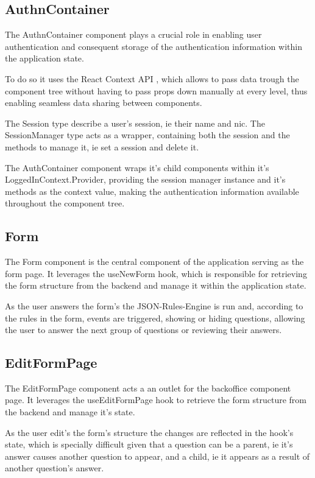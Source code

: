 \subsection{AuthnContainer}
The AuthnContainer component plays a crucial role in enabling user authentication and consequent storage of the authentication information within the application state.

To do so it uses the React Context API \cite{React_Context_API}, which allows to pass data trough the component tree without having to pass props down manually at every level, thus enabling seamless data sharing between components.

The Session type describe a user's session, ie their name and nic. The SessionManager type acts as a wrapper, containing both the session and the methods to manage it, ie set a session and delete it.

The AuthContainer component wraps it's child components within it's LoggedInContext.Provider, providing the session manager instance and it's methods as the context value, making the authentication information available throughout the component tree.

\subsection{Form}
The Form component is the central component of the application serving as the form page. It leverages the useNewForm hook, which is responsible for retrieving the form structure from the backend and manage it within the application state.

As the user answers the form's the JSON-Rules-Engine is run and, according to the rules in the form, events are triggered, showing or hiding questions, allowing the user to answer the next group of questions or reviewing their answers.

\subsection{EditFormPage}
The EditFormPage component acts a an outlet for the backoffice component page. It leverages the useEditFormPage hook to retrieve the form structure from the backend and manage it's state.

As the user edit's the form's structure the changes are reflected in the hook's state, which is specially difficult given that a question can be a parent, ie it's answer causes another question to appear, and a child, ie it appears as a result of another question's answer.


